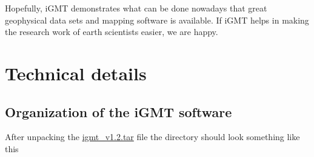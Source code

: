 \documentclass[11pt]{article}
\begin{document}
Hopefully, iGMT demonstrates what can be done nowadays that great
geophysical data sets and mapping software is available. If iGMT helps
in making the research work of earth scientists easier, we are happy.



  


\clearpage
\hspace{0.5cm}{\bf {\Large {\flushleft \appendixname}}}

\appendix

\section{Technical details}

\subsection{Organization of the iGMT software}

After unpacking the \url{igmt_v1.2.tar} file the directory should look
something like this
\footnotesize
\end{document}
